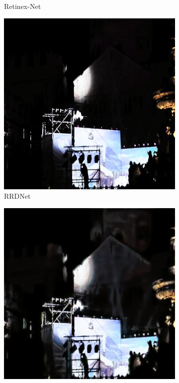 \documentclass[a4paper]{ctexart}
\begin{document}
\begin{figure}[htb]
\begin{subfigure}{0.19\textwidth}
				\captionsetup{font=scriptsize}
				\caption{Retinex-Net}
				\label{fig: Retinex-Net2}
			\end{subfigure}
			\begin{subfigure}{0.19\textwidth}
				\includegraphics[width=\linewidth]{picture/LLIE/Experiment/RRDNet2}
				\captionsetup{font=scriptsize}
				\caption{RRDNet}
				\label{fig: RRDNet2}
			\end{subfigure}
			\begin{subfigure}{0.19\textwidth}
				\includegraphics[width=\linewidth]{picture/LLIE/Experiment/KinD++2}

\end{subfigure}
\end{figure}
\end{document}
